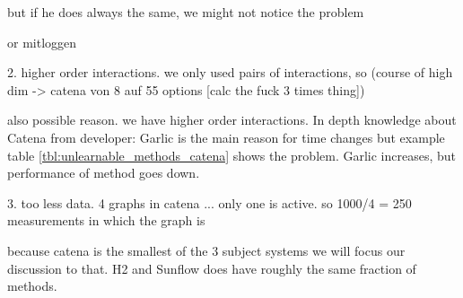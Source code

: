 but if he does always the same, we might not notice the problem

or mitloggen


2. higher order interactions. 
we only used pairs of interactions, so (course of high dim -> catena von 8 auf 55 options [calc the fuck 3 times thing])

also possible reason. we have higher order interactions. In depth knowledge about Catena from developer: Garlic is the main reason for time changes but example table \ref{tbl:unlearnable_methods_catena} shows the problem. Garlic increases, but performance of method goes down.

3. too less data. 4 graphs in catena ... only one is active. so 1000/4 = 250 measurements in which the graph is 


because catena is the smallest of the 3 subject systems we will focus our discussion to that. H2 and Sunflow does have roughly the same fraction of methods. 